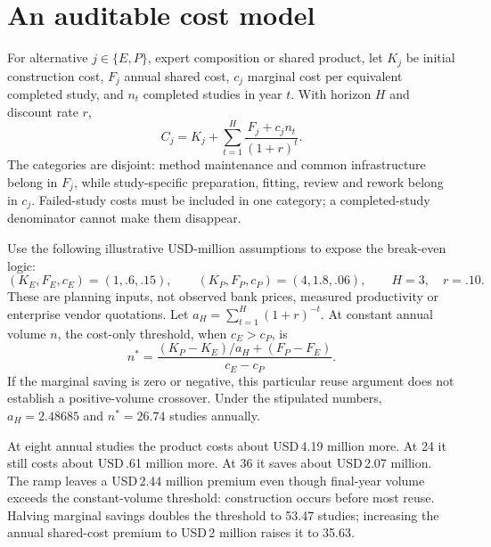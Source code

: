 \section{An auditable cost model}
\label{r3:cost-model}

For alternative $j\in\{E,P\}$, expert composition or shared product,
let $K_j$ be initial construction cost, $F_j$ annual shared cost,
$c_j$ marginal cost per equivalent completed study, and $n_t$ completed
studies in year $t$. With horizon $H$ and discount rate $r$,
\begin{equation}
 C_j=K_j+\sum_{t=1}^{H}\frac{F_j+c_jn_t}{(1+r)^t}.
 \label{r3:present-cost}
\end{equation}
The categories are disjoint: method maintenance and common infrastructure
belong in $F_j$, while study-specific preparation, fitting, review and
rework belong in $c_j$. Failed-study costs must be included in one
category; a completed-study denominator cannot make them disappear.

Use the following illustrative USD-million assumptions to expose the
break-even logic:
\[
 (K_E,F_E,c_E)=(1,.6,.15),\qquad
 (K_P,F_P,c_P)=(4,1.8,.06),\qquad H=3,\quad r=.10.
\]
These are planning inputs, not observed bank prices, measured productivity
or enterprise vendor quotations. Let
$a_H=\sum_{t=1}^H(1+r)^{-t}$. At constant annual volume $n$, the cost-only
threshold, when $c_E>c_P$, is
\begin{equation}
 n^*=\frac{(K_P-K_E)/a_H+(F_P-F_E)}{c_E-c_P}.
 \label{r3:reuse-threshold}
\end{equation}
If the marginal saving is zero or negative, this particular reuse argument
does not establish a positive-volume crossover. Under the stipulated
numbers, $a_H=2.48685$ and $n^*=26.74$ studies annually.

\begin{table}[htbp]\centering\small

\caption{Three-year present cost in illustrative USD millions. Annual
volumes are 8, 24 and 36, or the ramp $(4,16,30)$. Both alternatives
deliver the same specified scientific outputs.}
\label{r3:reuse-economics}
\end{table}

At eight annual studies the product costs about USD\,4.19 million more.
At 24 it still costs about USD\,.61 million more. At 36 it saves about
USD\,2.07 million. The ramp leaves a USD\,2.44 million premium even
though final-year volume exceeds the constant-volume threshold:
construction occurs before most reuse. Halving marginal savings doubles
the threshold to 53.47 studies; increasing the annual shared-cost
premium to USD\,2 million raises it to 35.63.

